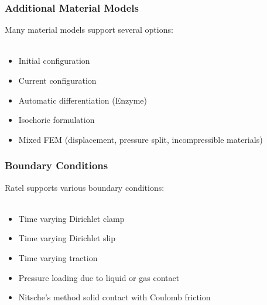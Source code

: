 \documentclass{beamer}
\begin{document}

\begin{frame}
\begin{center}
\frametitle{Additional Material Models}

Many material models support several options:\\

~\\

\begin{itemize}

\item Initial configuration\\

\item Current configuration\\

\item Automatic differentiation (Enzyme)\\

\item Isochoric formulation\\

\item Mixed FEM (displacement, pressure split, incompressible materials)\\

\end{itemize}

\end{center}
\end{frame}


\begin{frame}
\begin{center}
\frametitle{Boundary Conditions}

Ratel supports various boundary conditions:\\

~\\

\begin{itemize}

\item Time varying Dirichlet clamp\\

\item Time varying Dirichlet slip\\

\item Time varying traction\\

\item Pressure loading due to liquid or gas contact\\

\item Nitsche's method solid contact with Coulomb friction\\

\end{itemize}

\end{center}
\end{frame}
\end{document}
